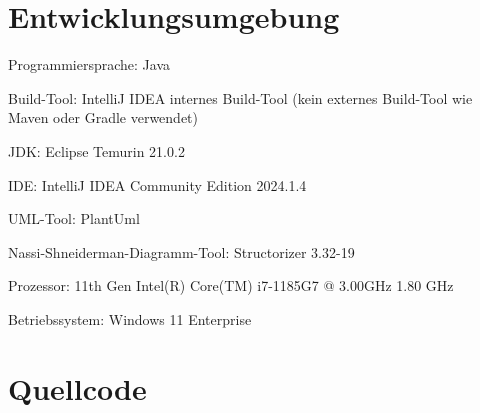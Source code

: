 \documentclass[a4paper,12pt]{report}
\begin{document}
\chapter{Entwicklungsumgebung}
Programmiersprache: Java

Build-Tool: IntelliJ IDEA internes Build-Tool (kein externes Build-Tool wie Maven oder Gradle verwendet)

JDK: Eclipse Temurin 21.0.2

IDE: IntelliJ IDEA Community Edition 2024.1.4

UML-Tool: PlantUml

Nassi-Shneiderman-Diagramm-Tool: Structorizer 3.32-19

Prozessor: 11th Gen Intel(R) Core(TM) i7-1185G7 @ 3.00GHz   1.80 GHz 

Betriebssystem: Windows 11 Enterprise

\chapter{Quellcode}

\end{document}
